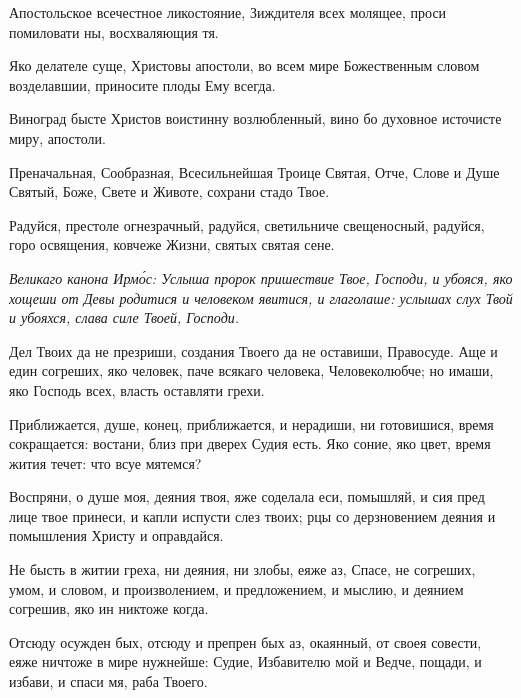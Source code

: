
Апостольское всечестное ликостояние, Зиждителя всех молящее, проси помиловати ны, восхваляющия тя.


Яко делателе суще, Христовы апостоли, во всем мире Божественным словом возделавшии, приносите плоды Ему всегда.


Виноград бысте Христов воистинну возлюбленный, вино бо духовное источисте миру, апостоли.


Преначальная, Сообразная, Всесильнейшая Троице Святая, Отче, Слове и Душе Святый, Боже, Свете и Животе, сохрани стадо Твое.


Радуйся, престоле огнезрачный, радуйся, светильниче свещеносный, радуйся, горо освящения, ковчеже Жизни, святых святая сене.

\itshape Великаго канона Ирм\'{о}с\normalfont{}: Услыша пророк пришествие Твое, Господи, и убояся, яко хощеши от Девы родитися и человеком явитися, и глаголаше: услышах слух Твой и убояхся, слава силе Твоей, Господи.

Дел Твоих да не презриши, создания Твоего да не оставиши, Правосуде. Аще и един согреших, яко человек, паче всякаго человека, Человеколюбче; но имаши, яко Господь всех, власть оставляти грехи.

Приближается, душе, конец, приближается, и нерадиши, ни готовишися, время сокращается: востани, близ при дверех Судия есть. Яко соние, яко цвет, время жития течет: что всуе мятемся?

Воспряни, о душе моя, деяния твоя, яже соделала еси, помышляй, и сия пред лице твое принеси, и капли испусти слез твоих; рцы со дерзновением деяния и помышления Христу и оправдайся.

Не бысть в житии греха, ни деяния, ни злобы, еяже аз, Спасе, не согреших, умом, и словом, и произволением, и предложением, и мыслию, и деянием согрешив, яко ин никтоже когда.

Отсюду осужден бых, отсюду и препрен бых аз, окаянный, от своея совести, еяже ничтоже в мире нужнейше: Судие, Избавителю мой и Ведче, пощади, и избави, и спаси мя, раба Твоего.

